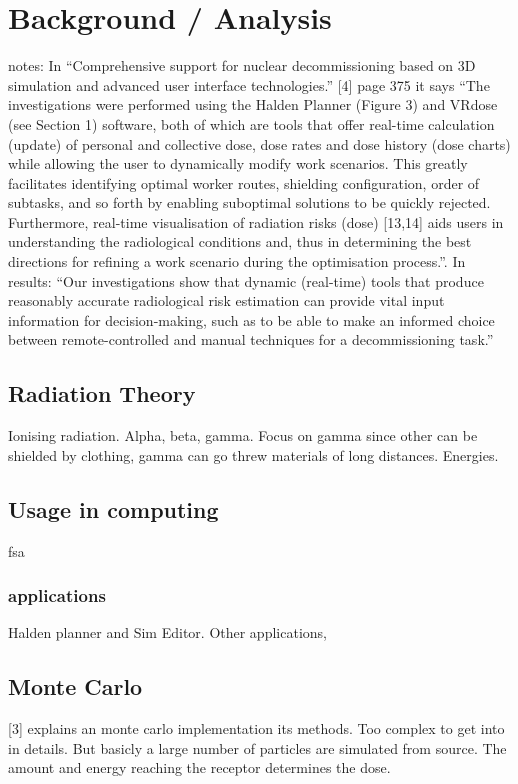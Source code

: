 \documentclass[11pt,twoside,a4paper]{report}
\begin{document}
\chapter{Background / Analysis}

notes:
In “Comprehensive support for nuclear decommissioning based on 3D simulation and advanced user interface technologies.” [4] page 375 it says “The investigations were performed using the Halden Planner (Figure 3) and VRdose (see Section 1) software, both of which are tools that offer real-time calculation (update) of personal and collective dose, dose rates and dose history (dose charts) while allowing the user to dynamically modify work scenarios. This greatly facilitates identifying optimal worker routes, shielding configuration, order of subtasks, and
so forth by enabling suboptimal solutions to be quickly rejected. Furthermore, real-time visualisation of radiation risks (dose) [13,14] aids users in understanding the radiological conditions and, thus in determining the best directions for refining a work scenario during the optimisation process.”. In results: “Our investigations show that dynamic (real-time)
tools that produce reasonably accurate radiological risk estimation can provide vital input information for decision-making, such as to be able to make an informed choice between remote-controlled and manual techniques for a decommissioning task.”

\section{Radiation Theory}
Ionising radiation. Alpha, beta, gamma. Focus on gamma since other can be shielded by clothing, gamma can go threw materials of long distances. Energies.


\section{Usage in computing}
fsa
\subsection{applications}

Halden planner and Sim Editor. Other applications,

\section{Monte Carlo}
[3] explains an monte carlo implementation its methods. Too complex to get into in details. But basicly a large number of particles are simulated from source. The amount and energy reaching the receptor determines the dose.
\end{document}
